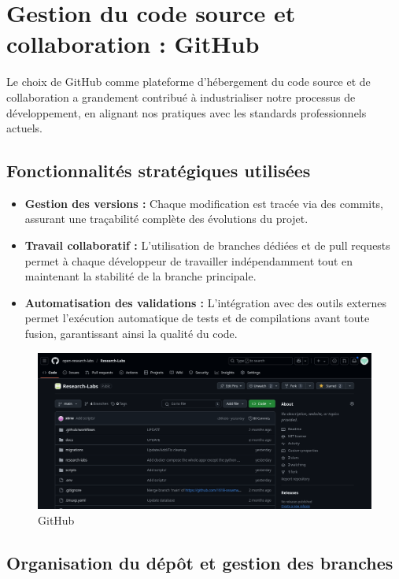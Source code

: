\documentclass{rapportPfe}
\begin{document}
\section{Gestion du code source et collaboration : GitHub}

Le choix de GitHub comme plateforme d’hébergement du code source et de collaboration a grandement contribué à industrialiser notre processus de développement, en alignant nos pratiques avec les standards professionnels actuels.

\subsection{Fonctionnalités stratégiques utilisées}

\begin{itemize}
    \item \textbf{Gestion des versions :} Chaque modification est tracée via des commits, assurant une traçabilité complète des évolutions du projet.
    \item \textbf{Travail collaboratif :} L’utilisation de branches dédiées et de pull requests permet à chaque développeur de travailler indépendamment tout en maintenant la stabilité de la branche principale.
    \item \textbf{Automatisation des validations :} L’intégration avec des outils externes permet l’exécution automatique de tests et de compilations avant toute fusion, garantissant ainsi la qualité du code.
\end{itemize}

\FloatBarrier
\begin{figure}[htbp]
    \centering
    \includegraphics[width=1.0\textwidth]{diagrams/ss_02.png}
    \caption{GitHub}
    \label{fig:diagram5}
\end{figure}

\subsection{Organisation du dépôt et gestion des branches}
\end{document}
